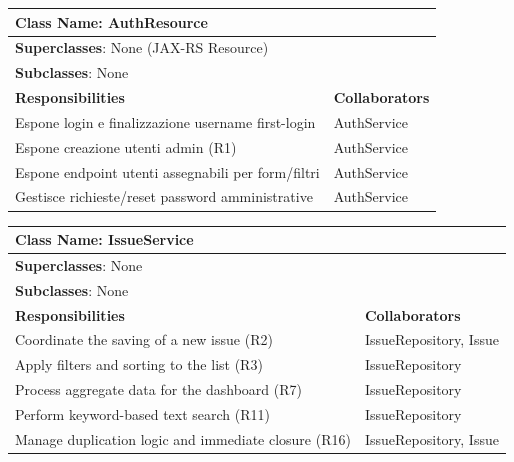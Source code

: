 ﻿\documentclass[11pt,a4paper]{article}
\begin{document}
\begin{tabularx}{\textwidth}{|X|X|}
    \hline
    \multicolumn{2}{|l|}{\textbf{Class Name}: AuthResource}                           \\ \hline
    \multicolumn{2}{|l|}{\textbf{Superclasses}: None (JAX-RS Resource)}               \\ \hline
    \multicolumn{2}{|l|}{\textbf{Subclasses}: None}                                    \\ \hline
    \textbf{Responsibilities}                                 & \textbf{Collaborators} \\ \hline
    Espone login e finalizzazione username first-login        & AuthService          \\ \hline
    Espone creazione utenti admin (R1)                        & AuthService          \\ \hline
    Espone endpoint utenti assegnabili per form/filtri        & AuthService          \\ \hline
    Gestisce richieste/reset password amministrative           & AuthService          \\ \hline
\end{tabularx}

\begin{tabularx}{\textwidth}{|X|X|}
    \hline
    \multicolumn{2}{|l|}{\textbf{Class Name}: IssueService}                       \\ \hline
    \multicolumn{2}{|l|}{\textbf{Superclasses}: None}                             \\ \hline
    \multicolumn{2}{|l|}{\textbf{Subclasses}: None}                               \\ \hline
    \textbf{Responsibilities}                            & \textbf{Collaborators} \\ \hline
    Coordinate the saving of a new issue (R2)            & IssueRepository, Issue \\ \hline
    Apply filters and sorting to the list (R3)           & IssueRepository        \\ \hline
    Process aggregate data for the dashboard (R7)        & IssueRepository        \\ \hline
    Perform keyword-based text search (R11)              & IssueRepository        \\ \hline
    Manage duplication logic and immediate closure (R16) & IssueRepository, Issue \\ \hline
\end{tabularx}
\end{document}
